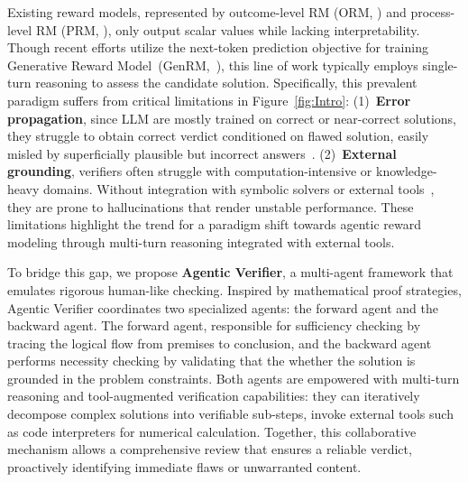 \documentclass[11pt]{article}
\begin{document}
\par
Existing reward models, represented by outcome-level RM (ORM, \citealp{zhong2025comprehensivesurveyrewardmodels,wang2024secretsrlhflargelanguage,Zhang:2025:CRM}) and process-level RM (PRM, \citealp{zhang2025lessonsdevelopingprocessreward,chen2025better,Lightman:2024:MATH500, cui2025processreinforcementimplicitrewards}), only output scalar values while lacking interpretability. 
Though recent efforts utilize the next-token prediction objective for training Generative Reward Model~(GenRM,~\citealp{Mahan:2025:GRM,Zhang:2025:GenerativeVerifiers,Chen:2025:RM-R1,Liu:2025:DeepseekGRM}), this line of work typically employs single-turn reasoning to assess the candidate solution. Specifically, this prevalent paradigm suffers from critical limitations in Figure~\ref{fig:Intro}: 
(1)~\textbf{Error propagation}, since LLM are mostly trained on correct or near-correct solutions, they struggle to obtain correct verdict conditioned on flawed solution, easily misled by superficially plausible but incorrect answers~\citep{Zhang:2025:GenerativeVerifiers}. (2)~\textbf{External grounding}, verifiers often struggle with computation-intensive or knowledge-heavy domains. Without integration with symbolic solvers or external tools~\citep{Dong:2025:AEPO,Feng:2025:ReTool,Dong:2025:ToolStar}, they are prone to hallucinations that render unstable performance.
These limitations highlight the trend for a paradigm shift towards agentic reward modeling through multi-turn reasoning integrated with external tools.

\par
To bridge this gap, we propose \textbf{Agentic Verifier}, a multi-agent framework that emulates rigorous human-like checking. Inspired by mathematical proof strategies, Agentic Verifier coordinates two specialized agents: the forward agent and the backward agent.
The forward agent, responsible for sufficiency checking by tracing the logical flow from premises to conclusion, and the backward agent performs necessity checking by validating that the whether the solution is grounded in the problem constraints.
Both agents are empowered with multi-turn reasoning and tool-augmented verification capabilities: they can iteratively decompose complex solutions into verifiable sub-steps, invoke external tools such as code interpreters for numerical calculation. 
Together, this collaborative mechanism allows a comprehensive review that ensures a reliable verdict, proactively identifying immediate flaws or unwarranted content.
\end{document}
